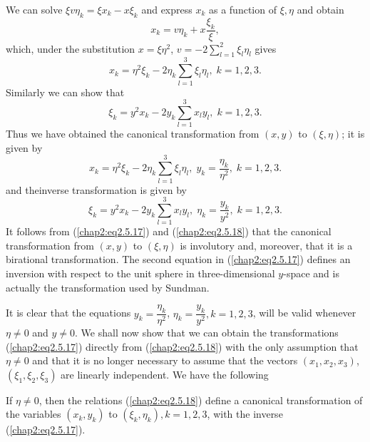 We can solve $\xi v \eta_k = \xi x_k - x \xi_k$ and express $x_k$ as a function of $\xi, \eta$ and obtain
$$
x_k = v \eta_k + x \frac{\xi_k}{\xi},
$$
which, under the substitution $x = \xi \eta^2$, $v = - 2 \sum\limits^2_{l=1} \xi_l \eta_l$ gives
\begin{equation*}
x_k = \eta^2 \xi_k - 2 \eta_k \sum\limits^3_{l=1} \xi_l \eta_l, \; k = 1,2,3.
\tag{2.5.15}\label{chap2:eq2.5.15} 
\end{equation*}
Similarly we can show that 
\begin{equation*}
\xi_k = y^2 x_k - 2y_k \sum\limits^3_{l=1} x_l y_l, \; k =1,2,3. \tag{2.5.16}\label{chap2:eq2.5.16} 
\end{equation*}
Thus we have obtained the canonical transformation from $(x,y)$ to $(\xi, \eta)$; it is given by
\begin{equation*}
x_k = \eta^2 \xi_k - 2\eta_k \sum\limits^3_{l=1} \xi_l \eta_l, \; y_k = \frac{\eta_k}{\eta^2}, \; k=1,2,3. \tag{2.5.17}\label{chap2:eq2.5.17} 
\end{equation*}
and the\pageoriginale inverse transformation is given by
\begin{equation*}
\xi_k = y^2 x_k - 2 y_k \sum\limits^3_{l=1} x_l y_l, \; \eta_k = \frac{y_k}{y^2}, \; k = 1,2,3. \tag{2.5.18} \label{chap2:eq2.5.18} 
\end{equation*}
It follows from (\ref{chap2:eq2.5.17}) and (\ref{chap2:eq2.5.18}) that the canonical transformation from $(x,y)$ to $(\xi, \eta)$ is involutory and, moreover, that it is a birational transformation. The second equation in (\ref{chap2:eq2.5.17}) defines an inversion with respect to the unit sphere in three-dimensional $y$-space and is actually the transformation used by Sundman.

It is clear that the equations $y_k = \dfrac{\eta_k}{\eta^2}$, $\eta_k=\dfrac{y_k}{y^2}, k = 1,2,3$, will be valid whenever $\eta \neq 0$ and $y \neq 0$. We shall now show that we can obtain the transformations (\ref{chap2:eq2.5.17}) directly from (\ref{chap2:eq2.5.18}) with the only assumption that $\eta \neq 0$ and that it is no longer necessary to assume that the vectors  $(x_1, x_2, x_3)$, $(\xi_1, \xi_2, \xi_3)$ are linearly independent. We have the following

\begin{subtheorem}\label{chap2:thm2.5.1}
If $\eta \neq 0$, then the relations (\ref{chap2:eq2.5.18}) define a canonical transformation of the variables $(x_k, y_k)$ to $(\xi_k , \eta_k), k =1,2,3$, with the inverse (\ref{chap2:eq2.5.17}).
\end{subtheorem}

